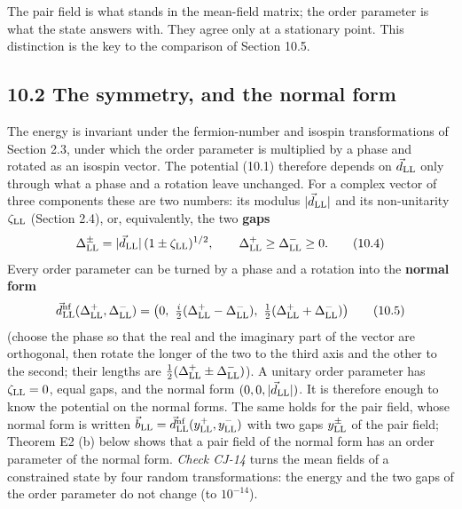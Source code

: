 \documentclass[
  10pt,
]{article}
\begin{document}
The pair field is what stands in the mean-field matrix; the order
parameter is what the state answers with. They agree only at a
stationary point. This distinction is the key to the comparison of
Section 10.5.

\hypertarget{the-symmetry-and-the-normal-form}{%
\subsection{10.2 The symmetry, and the normal
form}\label{the-symmetry-and-the-normal-form}}

The energy is invariant under the fermion-number and isospin
transformations of Section 2.3, under which the order parameter is
multiplied by a phase and rotated as an isospin vector. The potential
(10.1) therefore depends on \(\vec d_{\rm LL}\) only through what a
phase and a rotation leave unchanged. For a complex vector of three
components these are two numbers: its modulus
\(\lvert\vec d_{\rm LL}\rvert\) and its non-unitarity \(\zeta_{\rm LL}\)
(Section 2.4), or, equivalently, the two \textbf{gaps}
\[\Delta^\pm_{\rm LL}=\lvert\vec d_{\rm LL}\rvert\,(1\pm\zeta_{\rm LL})^{1/2},\qquad\Delta^+_{\rm LL}\ge\Delta^-_{\rm LL}\ge0.\tag{10.4}\]
Every order parameter can be turned by a phase and a rotation into the
\textbf{normal form}
\[\vec d^{\rm nf}_{\rm LL}(\Delta^+_{\rm LL},\Delta^-_{\rm LL})=\big(0,\ \tfrac i2(\Delta^+_{\rm LL}-\Delta^-_{\rm LL}),\ \tfrac12(\Delta^+_{\rm LL}+\Delta^-_{\rm LL})\big)\tag{10.5}\]
(choose the phase so that the real and the imaginary part of the vector
are orthogonal, then rotate the longer of the two to the third axis and
the other to the second; their lengths are
\(\tfrac12(\Delta^+_{\rm LL}\pm\Delta^-_{\rm LL})\)). A unitary order
parameter has \(\zeta_{\rm LL}=0\), equal gaps, and the normal form
\((0,0,\lvert\vec d_{\rm LL}\rvert)\). It is therefore enough to know
the potential on the normal forms. The same holds for the pair field,
whose normal form is written
\(\vec b_{\rm LL}=\vec d^{\rm nf}_{\rm LL}(y^+_{\rm LL},y^-_{\rm LL})\)
with two gaps \(y^\pm_{\rm LL}\) of the pair field; Theorem E2 (b) below
shows that a pair field of the normal form has an order parameter of the
normal form. \emph{Check CJ-14} turns the mean fields of a constrained
state by four random transformations: the energy and the two gaps of the
order parameter do not change (to \(10^{-14}\)).
\end{document}
